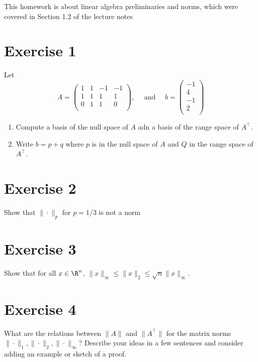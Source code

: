 \documentclass{article}
\begin{document}
\noindent This homework is about linear algebra preliminaries and norms, which were covered in Section 1.2 of the lecture notes

\section*{Exercise 1}

Let
\begin{equation}
    A = \left(
        \begin{array}{rrrr}
            1 & 1 & -1 & -1 \\
            1 & 1 & 1 & 1 \\
            0 & 1 & 1 & 0 \\
        \end{array}
    \right), \quad \text { and } \quad
    b = \left(
        \begin{array}{r}
            -1\\
            4\\
            -1\\
            2\\
        \end{array}
        \right)
\end{equation}
\begin{enumerate}
    \item Compute a basis of the null space of $A$ adn a basis of the range space of $A^\top$.
    \item Write $b = p + q$ where $p$ is in the null space of $A$ and $Q$ in the range space of $A^\top$.
\end{enumerate}

\section*{Exercise 2}

Show that $\| \cdot \|_p$ for $p=1/3$ is not a norm 

\section*{Exercise 3}

Show that for all $x\in\R^n$, $\|x\|_{\infty} \leq \|x\|_2 \leq \sqrt{n}\|x\|_{\infty}$.

\section*{Exercise 4}

What are the relations between $\|A \|$ and $\|A^\top\|$ for the matrix norms $\|\cdot\|_1, \|\cdot\|_2, \|\cdot\|_{\infty}$? Describe your ideas in a few sentences and consider adding an example or sketch of a proof.
\end{document}
